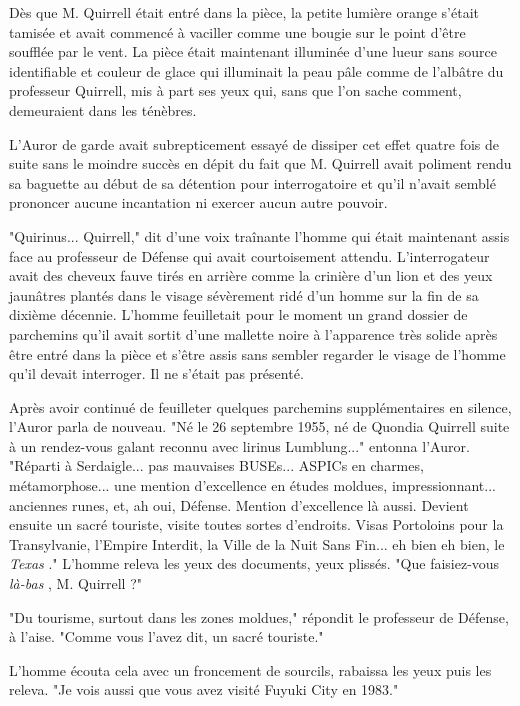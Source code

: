 Dès que M. Quirrell était entré dans la pièce, la petite lumière orange s'était tamisée et avait commencé à vaciller comme une bougie sur le point d'être soufflée par le vent. La pièce était maintenant illuminée d'une lueur sans source identifiable et couleur de glace qui illuminait la peau pâle comme de l'albâtre du professeur Quirrell, mis à part ses yeux qui, sans que l'on sache comment, demeuraient dans les ténèbres.

L'Auror de garde avait subrepticement essayé de dissiper cet effet quatre fois de suite sans le moindre succès en dépit du fait que M. Quirrell avait poliment rendu sa baguette au début de sa détention pour interrogatoire et qu'il n'avait semblé prononcer aucune incantation ni exercer aucun autre pouvoir.

"Quirinus... Quirrell," dit d'une voix traînante l'homme qui était maintenant assis face au professeur de Défense qui avait courtoisement attendu. L'interrogateur avait des cheveux fauve tirés en arrière comme la crinière d'un lion et des yeux jaunâtres plantés dans le visage sévèrement ridé d'un homme sur la fin de sa dixième décennie. L'homme feuilletait pour le moment un grand dossier de parchemins qu'il avait sortit d'une mallette noire à l'apparence très solide après être entré dans la pièce et s'être assis sans sembler regarder le visage de l'homme qu'il devait interroger. Il ne s'était pas présenté.

Après avoir continué de feuilleter quelques parchemins supplémentaires en silence, l'Auror parla de nouveau. "Né le 26 septembre 1955, né de Quondia Quirrell suite à un rendez-vous galant reconnu avec lirinus Lumblung..." entonna l'Auror. "Réparti à Serdaigle... pas mauvaises BUSEs... ASPICs en charmes, métamorphose... une mention d'excellence en études moldues, impressionnant... anciennes runes, et, ah oui, Défense. Mention d'excellence là aussi. Devient ensuite un sacré touriste, visite toutes sortes d'endroits. Visas Portoloins pour la Transylvanie, l'Empire Interdit, la Ville de la Nuit Sans Fin... eh bien eh bien, le \emph{Texas} ." L'homme releva les yeux des documents, yeux plissés. "Que faisiez-vous \emph{là-bas} , M. Quirrell ?"

"Du tourisme, surtout dans les zones moldues," répondit le professeur de Défense, à l'aise. "Comme vous l'avez dit, un sacré touriste."

L'homme écouta cela avec un froncement de sourcils, rabaissa les yeux puis les releva. "Je vois aussi que vous avez visité Fuyuki City en 1983."

